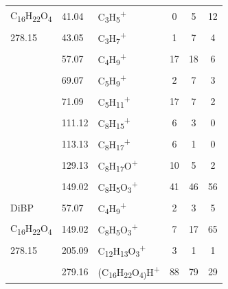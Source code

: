 {\begin{longtable}[c]{lllccc}
C\textsubscript{16}H\textsubscript{22}O\textsubscript{4} & 41.04  & C\textsubscript{3}H\textsubscript{5}\textsuperscript{+}                   & 0  & 5  & 12 \\
278.15                                                   & 43.05  & C\textsubscript{3}H\textsubscript{7}\textsuperscript{+}                   & 1  & 7  & 4  \\
                                                         & 57.07  & C\textsubscript{4}H\textsubscript{9}\textsuperscript{+}                   & 17 & 18 & 6  \\
                                                         & 69.07  & C\textsubscript{5}H\textsubscript{9}\textsuperscript{+}                   & 2  & 7  & 3  \\
                                                         & 71.09  & C\textsubscript{5}H\textsubscript{11}\textsuperscript{+}                  & 17 & 7  & 2  \\
                                                         & 111.12 & C\textsubscript{8}H\textsubscript{15}\textsuperscript{+}                  & 6  & 3  & 0  \\
                                                         & 113.13 & C\textsubscript{8}H\textsubscript{17}\textsuperscript{+}                  & 6  & 1  & 0  \\
                                                         & 129.13 & C\textsubscript{8}H\textsubscript{17}O\textsuperscript{+}                 & 10 & 5  & 2  \\
                                                         & 149.02 & C\textsubscript{8}H\textsubscript{5}O\textsubscript{3}\textsuperscript{+} & 41 & 46 & 56 \\
\hline
DiBP      & 57.07                & C\textsubscript{4}H\textsubscript{9}\textsuperscript{+}                           & 2            & 3            & 5            \\
C\textsubscript{16}H\textsubscript{22}O\textsubscript{4}          & 149.02               & C\textsubscript{8}H\textsubscript{5}O\textsubscript{3}\textsuperscript{+}      & 7            & 17           & 65           \\
278.15          & 205.09               & C\textsubscript{12}H\textsubscript{13}O\textsubscript{3}\textsuperscript{+}    & 3            & 1            & 1            \\
          & 279.16               & (C\textsubscript{16}H\textsubscript{22}O\textsubscript{4)}H\textsuperscript{+} & 88           & 79           & 29           \\

\end{longtable}}
